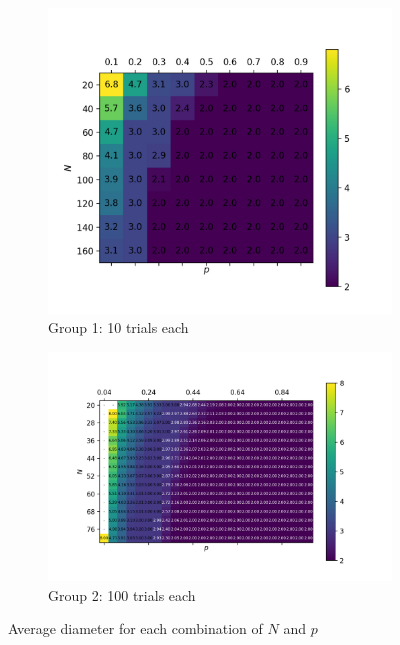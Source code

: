 \begin{figure}
\centering
\begin{subfigure}[c]{0.48\textwidth}
\centering
\includegraphics[height=0.225\textheight]{fig/diameter_big}
\caption{Group 1: 10 trials each}
\end{subfigure}
\quad
\begin{subfigure}[c]{0.48\textwidth}
\centering
\includegraphics[height=0.225\textheight]{fig/diameter_small}
\caption{Group 2: 100 trials each}
\end{subfigure}
\caption{Average diameter for each combination of $N$ and $p$}
\label{fig:diameter}
\end{figure}

